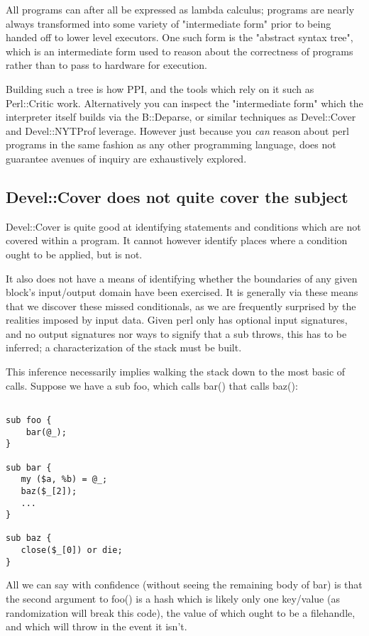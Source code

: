 \documentclass{article}
\begin{document}
All programs can after all be expressed as lambda calculus; programs are nearly always transformed into some variety of "intermediate form" prior to being handed off to lower level executors.
One such form is the "abstract syntax tree", which is an intermediate form used to reason about the correctness of programs rather than to pass to hardware for execution.

Building such a tree is how PPI, and the tools which rely on it such as Perl::Critic work.
Alternatively you can inspect the "intermediate form" which the interpreter itself builds via the B::Deparse, or similar techniques as Devel::Cover and Devel::NYTProf leverage.
However just because you \textit{can} reason about perl programs in the same fashion as any other programming language, does not guarantee avenues of inquiry are exhaustively explored.

\subsection{Devel::Cover does not quite cover the subject}

Devel::Cover is quite good at identifying statements and conditions which are not covered within a program.
It cannot however identify places where a condition ought to be applied, but is not.

It also does not have a means of identifying whether the boundaries of any given block's input/output domain have been exercised.
It is generally via these means that we discover these missed conditionals, as we are frequently surprised by the realities imposed by input data.
Given perl only has optional input signatures, and no output signatures nor ways to signify that a sub throws, this has to be inferred; a characterization of the stack must be built.

This inference necessarily implies walking the stack down to the most basic of calls.
Suppose we have a sub foo, which calls bar() that calls baz():

\begin{lstlisting}

sub foo {
    bar(@_);
}

sub bar {
   my ($a, %b) = @_;
   baz($_[2]);
   ...
}

sub baz {
   close($_[0]) or die;
}

\end{lstlisting}

All we can say with confidence (without seeing the remaining body of bar) is that the second argument to foo() is a hash which is likely only one key/value (as randomization will break this code), the value of which ought to be a filehandle, and which will throw in the event it isn't.
\end{document}
